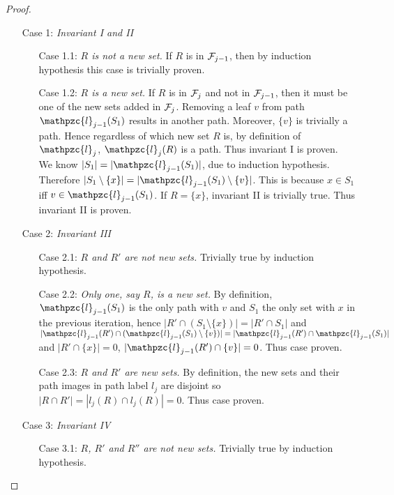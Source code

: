 \documentclass{llncs}
\def\cF{{\cal F}}
\def\cl{\mathpzc{l}}
\begin{document}
\begin{proof}
  \noindent
  \begin{enumerate}
  \item [Case 1:] {\em Invariant I and II} 
    \begin{enumerate}
    \item [Case 1.1:] {\em $R$ is not a new set.} If $R$ is in
      $\cF_{j-1}$, then by induction hypothesis this case is trivially
      proven.
    \item [Case 1.2:] {\em $R$ is a new set.} If $R$ is in $\cF_{j}$
      and not in $\cF_{j-1}$, then it must be one of the new sets
      added in $\cF_j$. Removing a leaf $v$ from path $\cl_{j-1}(S_1)$
      results in another path. Moreover, $\{v\}$ is trivially a
      path. Hence regardless of which new set $R$ is, by definition of
      $\cl_j$, $\cl_{j}(R)$ is a path. Thus invariant I is proven.\\
      We know $|S_1| = |\cl_{j-1}(S_1)|$, due to induction
      hypothesis. Therefore $|S_1 \setminus \{x\}| = |\cl_{j-1}(S_1)
      \setminus \{v\}|$. This is because $x \in S_1$ iff $v \in
      \cl_{j-1}(S_1)$. If $R = \{x\}$, invariant II is trivially
      true. Thus invariant II is proven.
  \end{enumerate}
  \item [Case 2:] {\em Invariant III}
    \begin{enumerate}
    \item [Case 2.1:] {\em $R$ and $R'$ are not new sets.} Trivially
      true by induction hypothesis.
    \item [Case 2.2:] {\em Only one, say $R$, is a new set.} 
  By definition, $\cl_{j-1}(S_1)$ is the only path with $v$ and $S_1$ the
  only set with $x$ in the
  previous iteration, hence $|R' \cap (S_1 \setminus \{x\})| = |R' \cap S_1|$
  and $|\cl_{j-1}(R') \cap (\cl_{j-1}(S_1) \setminus \{v\})| = |\cl_{j-1}(R') \cap \cl_{j-1}(S_1)|$ and $|R' \cap
  \{x\}| = 0$, $|\cl_{j-1}(R') \cap \{v\}| = 0$. Thus case proven.
    \item [Case 2.3:] {\em $R$ and $R'$ are new sets.} By definition,
      the new sets and their path images in path label $l_j$ are
      disjoint so $|R \cap R'| = |l_j(R) \cap l_j(R)| = 0$. Thus case
      proven.
    \end{enumerate}
  \item [Case 3:] {\em Invariant IV}
    \begin{enumerate}
    \item [Case 3.1:] {\em $R$, $R'$ and $R''$ are not new sets.} Trivially
      true by induction hypothesis.

\end{enumerate}
\end{enumerate}
\end{proof}
\end{document}
